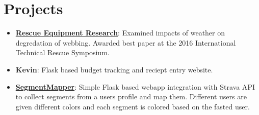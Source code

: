 \documentclass[letterpaper,11pt]{article}
\newcommand{\resumeItem}[2]{
  \item\small{
    \textbf{#1}{: #2 \vspace{-2pt}}
  }
}
\newcommand{\resumeSubItem}[2]{\resumeItem{#1}{#2}\vspace{-4pt}}
\newcommand{\resumeSubHeadingListStart}{\begin{itemize}[leftmargin=*]}
\newcommand{\resumeSubHeadingListEnd}{\end{itemize}}
\begin{document}
\section{Projects}
\resumeSubHeadingListStart
    \resumeSubItem{\href{https://drive.google.com/file/d/12Pu0LSSWyjaasNmhFRbv64ZdeCIGxLNi/view}{Rescue Equipment Research}}{Examined impacts of weather on degredation of webbing.  Awarded best paper at the 2016 International Technical Rescue Symposium.}
    \resumeSubItem{Kevin}{Flask based budget tracking and reciept entry website.}
    \resumeSubItem{\href{https://github.com/landonbw/SegmentMapper}{SegmentMapper}}{Simple Flask based webapp integration with Strava API to collect segments from a users profile and map them.  Different users are given different colors and each segment is colored based on the fasted user.}
  \resumeSubHeadingListEnd

%


\end{document}
